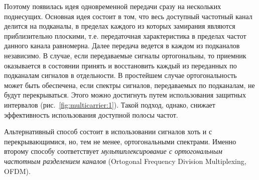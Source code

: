 \documentclass{book}
\numberwithin{theorem}{chapter}
\numberwithin{statement}{chapter}
\numberwithin{lemma}{chapter}
\theoremstyle{definition}
\numberwithin{task}{chapter}
\theoremstyle{remark}
\numberwithin{example}{chapter}
\theoremstyle{definition}
\numberwithin{definition}{chapter}
\theoremstyle{remark}
\theoremstyle{remark}
\numberwithin{lyrics}{section}
\begin{document}
Поэтому появилась идея одновременной передачи сразу на нескольких поднесущих. %
Основная идея состоит в том, что весь доступный частотный канал делится на подканалы, в пределах каждого из которых замирания являются приблизительно плоскими, т.е. передаточная характеристика в пределах частот данного канала равномерна. Далее передача ведется в каждом из подканалов независимо. В случае, если передаваемые сигналы ортогональны, то приемник оказывается в состоянии принять и восстановить каждый из переданных по подканалам сигналов в отдельности. В простейшем случае ортогональность может быть обеспечена, если спектры сигналов, передаваемых по подканалам, не будут перекрываться. Этого можно достигнуть путем использования защитных интервалов (рис.~\ref{fig:multicarrier:1}). Такой подход, однако, снижает эффективность использования доступной полосы частот. 

Альтернативный способ состоит в использовании сигналов хоть и с перекрывающимися, но, тем не менее, ортогональными спектрами. Именно второму способу соответствует \emph{мультиплексирование с ортогональным частотным разделением каналов} (Ortogonal Frequency Division Multiplexing, OFDM).

\end{document}
